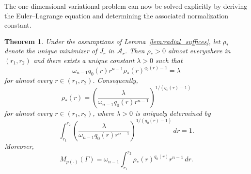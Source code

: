 \documentclass[12pt]{amsart}
\numberwithin{equation}{section}
\theoremstyle{plain}
\newtheorem{theorem}[equation]{Theorem}
\theoremstyle{definition}
\begin{document}
The one-dimensional variational problem can now be solved explicitly by deriving
the Euler--Lagrange equation and determining the associated normalization constant.
\begin{theorem}
\label{thm:annulus_formula}
Under the assumptions of Lemma~\ref{lem:radial_suffices}, let
$\rho_*$ denote the unique minimizer of $J_r$ in $\mathcal A_r$.
Then $\rho_*>0$ almost everywhere in $(r_1,r_2)$ and there exists a
unique constant $\lambda>0$ such that
\begin{equation}
\label{eq:annulus_EL}
\omega_{n-1}q_0(r)r^{n-1}
\rho_*(r)^{q_0(r)-1}
=
\lambda
\end{equation}
for almost every $r\in(r_1,r_2)$.
Consequently,
\begin{equation}
\label{eq:annulus_extr}
\rho_*(r)
=
\left(
\frac{\lambda}
{\omega_{n-1}q_0(r)r^{n-1}}
\right)^{\!1/(q_0(r)-1)}
\end{equation}
for almost every $r\in(r_1,r_2)$,
where $\lambda>0$ is uniquely determined by
\begin{equation}
\label{eq:annulus_normalization}
\int_{r_1}^{r_2}
\left(
\frac{\lambda}
{\omega_{n-1}q_0(r)r^{n-1}}
\right)^{\!1/(q_0(r)-1)}
\,dr
=
1.
\end{equation}
Moreover,
\begin{equation}
\label{eq:annulus_modulus_formula}
M_{p(\cdot)}(\Gamma)
=
\omega_{n-1}
\int_{r_1}^{r_2}
\rho_*(r)^{q_0(r)}r^{n-1}\,dr.
\end{equation}
\end{theorem}
\end{document}
